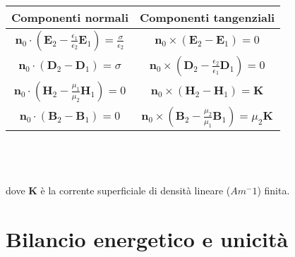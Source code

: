 \documentclass[a4paper]{article}
\begin{document}
\begin{tabular}{||c||c||}
\hline
\hline
\textbf{Componenti normali}&\textbf{Componenti tangenziali}\\
\hline
\hline
$\textbf{n}_0\cdot(\textbf{E}_2-\frac{\epsilon_1}{\epsilon_2}\textbf{E}_1) = \frac{\sigma}{\epsilon_2}$&$\textbf{n}_0\times(\textbf{E}_2-\textbf{E}_1)=0$\\
\hline
$\textbf{n}_0\cdot(\textbf{D}_2-\textbf{D}_1)=\sigma$&$\textbf{n}_0\times(\textbf{D}_2-\frac{\epsilon_2}{\epsilon_1}\textbf{D}_1)=0$\\
\hline
$\textbf{n}_0\cdot(\textbf{H}_2-\frac{\mu_1}{\mu_2}\textbf{H}_1)=0$&$\textbf{n}_0\times(\textbf{H}_2-\textbf{H}_1)=\textbf{K}$\\
\hline
$\textbf{n}_0\cdot(\textbf{B}_2-\textbf{B}_1)=0$&$\textbf{n}_0\times(\textbf{B}_2-\frac{\mu_2}{\mu_1}\textbf{B}_1)=\mu_2\textbf{K}$\\
\hline\hline
\end{tabular}\\\\\\
dove \textbf{K} è la corrente superficiale di densità lineare ($Am^-1$) finita.
\section{Bilancio energetico e unicità}
\end{document}

